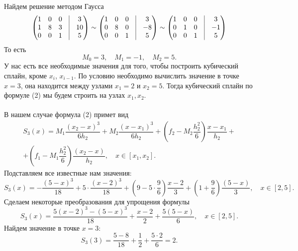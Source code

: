 \documentclass[a4paper, 12pt]{article}
\begin{document}
	Найдем решение методом Гаусса 
	$$\begin{pmatrix}
		1&0&0&\vline&3\\
		1&8&3&\vline&10\\
		0&0&1&\vline&5
	\end{pmatrix}
	\sim 
	\begin{pmatrix}
		1&0&0&\vline&3\\
		0&8&0&\vline&-8\\
		0&0&1&\vline&5
	\end{pmatrix}
	\sim
	\begin{pmatrix}
		1&0&0&\vline&3\\
		0&1&0&\vline&-1\\
		0&0&1&\vline&5
	\end{pmatrix}$$
	То есть $$M_0 = 3,\quad M_1 = -1,\quad M_2 = 5.$$
	У нас есть все необходимые значения для того, чтобы построить кубический сплайн, кроме $x_i$, $x_{i-1}$. По условию необходимо вычислить значение в точке $x=3$, она находится между узлами $x_1 = 2$ и $x_2 = 5$. Тогда кубический сплайн по формуле (2) мы будем строить на узлах $x_1, x_2$.\\\\
	В нашем случае формула (2) примет вид \begin{multline*}
		S_3(x) = M_1\dfrac{(x_2 - x)^3}{6h_2} + M_{2}\dfrac{(x-x_1)^3}{6h_2} + \left(f_2 - M_2\dfrac{h_2^2}{6}\right)\dfrac{x-x_1}{h_2} +\\+ \left(f_1 - M_1\dfrac{h_2^2}{6}\right)\dfrac{(x_2 - x)}{h_2},\quad x\in [x_1, x_2].
	\end{multline*}
	Подставляем все известные нам значения:
	$$
	S_3(x) = -\dfrac{(5 - x)^3}{18} +5\cdot\dfrac{(x-2)^3}{18} + \left(9 -5\cdot\dfrac{9}{6}\right)\dfrac{x-2}{3} + \left(1 + \dfrac{9}{6}\right)\dfrac{(5 - x)}{3},\quad x\in [2, 5].
	$$
	Сделаем некоторые преобразования для упрощения формулы
	$$
	S_3(x) = \dfrac{5(x - 2)^3 - (5-x)^3}{18} + \dfrac{x-2}{2} + \dfrac{5(5 - x)}{6},\quad x\in [2, 5].
	$$
	Найдем значение в точке $x=3$:
	$$
	S_3(3) = \dfrac{5 - 8}{18} + \dfrac{1}{2} + \dfrac{5\cdot 2}{6} = 2.
	$$
\end{document}
